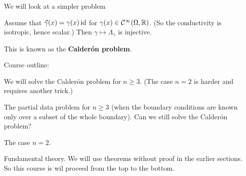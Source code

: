 We will look at a simpler problem

Assume that $\vec\gamma(x) = \gamma(x) \operatorname{id}$ for $\gamma(x) \in \mathcal{C}^\infty(\Omega,\mathbb{R})$.
(So the conductivity is isotropic, hence scalar.)
Then $\gamma \mapsto \Lambda_\gamma$ is injective.

This is known as the \textbf{Calder\'on problem}.

Course outline:

\begin{itm}
  \io
  We will solve the Calder\'on problem for $n \geq 3$.
  (The case $n=2$ is harder and requires another trick.)

  \io
  The partial data problem for $n \geq 3$ (when the boundary conditions are known only over a subset of the whole boundary).
  Can we still solve the Calder\'on problem?

  \io
  The case $n=2$.

  \io
  Fundamental theory.
  We will use theorems without proof in the earlier sections.
  So this course is wil proceed from the top to the bottom.
\end{itm}
